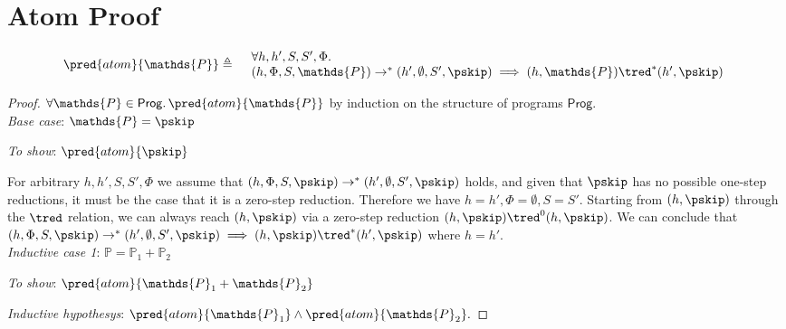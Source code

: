\section{Atom Proof}

\[
\begin{array}{r l}
	\pred{atom}{\mathds{P}} \triangleq&
	\begin{array}{l}
	\forall h, h', S, S', \Phi \ldotp \\
	(h, \Phi, S, \mathds{P}) \rightarrow^* (h', \emptyset, S', \pskip) \implies 
	(h, \mathds{P}) \tred^* (h', \pskip)
	\end{array}
\end{array}
\]

{\parindent0pt
\begin{proof}
$\forall \mathds{P} \in \mathsf{Prog} \ldotp \pred{atom}{\mathds{P}}$ by induction on the structure of programs $\mathsf{Prog}$. \\

\textit{Base case}: $\mathds{P} = \pskip$

\textit{To show}: $\pred{atom}{\pskip}$

For arbitrary $h, h', S, S', \Phi$ we assume that $(h, \Phi, S, \pskip) \rightarrow^* (h', \emptyset, S', \pskip)$ holds, and given that $\pskip$ has no possible one-step reductions, it must be the case that it is a zero-step reduction. Therefore we have $h = h', \Phi = \emptyset, S = S'$. Starting from $(h, \pskip)$ through the $\tred$ relation, we can always reach $(h, \pskip)$ via a zero-step reduction $(h, \pskip) \tred^0 (h, \pskip)$. We can conclude that $(h, \Phi, S, \pskip) \rightarrow^* (h', \emptyset, S', \pskip) \implies (h, \pskip) \tred^* (h', \pskip)$ where $h = h'$. \\

\textit{Inductive case 1}: $\mathds{P} = \mathds{P}_1 + \mathds{P}_2$

\textit{To show}: $\pred{atom}{\mathds{P}_1 + \mathds{P}_2}$

\textit{Inductive hypothesys}: $\pred{atom}{\mathds{P}_1} \land \pred{atom}{\mathds{P}_2}.$


\end{proof}}
